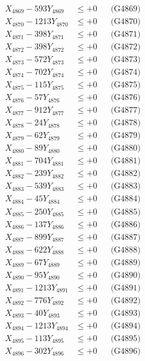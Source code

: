 \documentclass[a4paper,10pt]{article}
\begin{document}
{\begin{align}
X_{4869} - 593Y_{4869} &\leq +0 && \text{(G4869)} \\
X_{4870} - 1213Y_{4870} &\leq +0 && \text{(G4870)} \\
\allowbreak
X_{4871} - 398Y_{4871} &\leq +0 && \text{(G4871)} \\
X_{4872} - 398Y_{4872} &\leq +0 && \text{(G4872)} \\
X_{4873} - 572Y_{4873} &\leq +0 && \text{(G4873)} \\
X_{4874} - 702Y_{4874} &\leq +0 && \text{(G4874)} \\
X_{4875} - 115Y_{4875} &\leq +0 && \text{(G4875)} \\
X_{4876} - 57Y_{4876} &\leq +0 && \text{(G4876)} \\
X_{4877} - 912Y_{4877} &\leq +0 && \text{(G4877)} \\
X_{4878} - 24Y_{4878} &\leq +0 && \text{(G4878)} \\
X_{4879} - 62Y_{4879} &\leq +0 && \text{(G4879)} \\
X_{4880} - 89Y_{4880} &\leq +0 && \text{(G4880)} \\
\allowbreak
X_{4881} - 704Y_{4881} &\leq +0 && \text{(G4881)} \\
X_{4882} - 239Y_{4882} &\leq +0 && \text{(G4882)} \\
X_{4883} - 539Y_{4883} &\leq +0 && \text{(G4883)} \\
X_{4884} - 45Y_{4884} &\leq +0 && \text{(G4884)} \\
X_{4885} - 250Y_{4885} &\leq +0 && \text{(G4885)} \\
X_{4886} - 137Y_{4886} &\leq +0 && \text{(G4886)} \\
X_{4887} - 899Y_{4887} &\leq +0 && \text{(G4887)} \\
X_{4888} - 622Y_{4888} &\leq +0 && \text{(G4888)} \\
X_{4889} - 67Y_{4889} &\leq +0 && \text{(G4889)} \\
X_{4890} - 95Y_{4890} &\leq +0 && \text{(G4890)} \\
\allowbreak
X_{4891} - 1213Y_{4891} &\leq +0 && \text{(G4891)} \\
X_{4892} - 776Y_{4892} &\leq +0 && \text{(G4892)} \\
X_{4893} - 40Y_{4893} &\leq +0 && \text{(G4893)} \\
X_{4894} - 1213Y_{4894} &\leq +0 && \text{(G4894)} \\
X_{4895} - 113Y_{4895} &\leq +0 && \text{(G4895)} \\
X_{4896} - 302Y_{4896} &\leq +0 && \text{(G4896)} \\

\end{align}}
\end{document}

